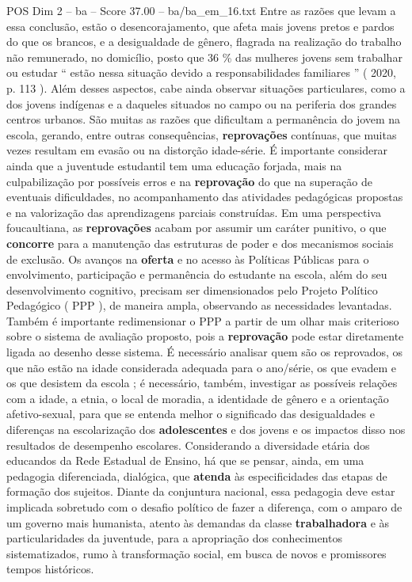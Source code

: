 \begin{textsample}{POS Dim 2 – ba – Score 37.00 – ba/ba\_em\_16.txt}
Entre as razões que levam a essa conclusão, estão o desencorajamento, que afeta mais jovens pretos e pardos do que os brancos, e a desigualdade de gênero, flagrada na realização do trabalho não remunerado, no domicílio, posto que 36 \% das mulheres jovens sem trabalhar ou estudar “ estão nessa situação devido a responsabilidades familiares ” ( 2020, p. 113 ).
Além desses aspectos, cabe ainda observar situações particulares, como a dos jovens indígenas e a daqueles situados no campo ou na periferia dos grandes centros urbanos.
São muitas as razões que dificultam a permanência do jovem na escola, gerando, entre outras consequências, \textbf{reprovações} contínuas, que muitas vezes resultam em evasão ou na distorção idade-série.
É importante considerar ainda que a juventude estudantil tem uma educação forjada, mais na culpabilização por possíveis erros e na \textbf{reprovação} do que na superação de eventuais dificuldades, no acompanhamento das atividades pedagógicas propostas e na valorização das aprendizagens parciais construídas.
Em uma perspectiva foucaultiana, as \textbf{reprovações} acabam por assumir um caráter punitivo, o que \textbf{concorre} para a manutenção das estruturas de poder e dos mecanismos sociais de exclusão.
Os avanços na \textbf{oferta} e no acesso às Políticas Públicas para o envolvimento, participação e permanência do estudante na escola, além do seu desenvolvimento cognitivo, precisam ser dimensionados pelo Projeto Político Pedagógico ( PPP ), de maneira ampla, observando as necessidades levantadas.
Também é importante redimensionar o PPP a partir de um olhar mais criterioso sobre o sistema de avaliação proposto, pois a \textbf{reprovação} pode estar diretamente ligada ao desenho desse sistema.
É necessário analisar quem são os reprovados, os que não estão na idade considerada adequada para o ano/série, os que evadem e os que desistem da escola ; é necessário, também, investigar as possíveis relações com a idade, a etnia, o local de moradia, a identidade de gênero e a orientação afetivo-sexual, para que se entenda melhor o significado das desigualdades e diferenças na escolarização dos \textbf{adolescentes} e dos jovens e os impactos disso nos resultados de desempenho escolares.
Considerando a diversidade etária dos educandos da Rede Estadual de Ensino, há que se pensar, ainda, em uma pedagogia diferenciada, dialógica, que \textbf{atenda} às especificidades das etapas de formação dos sujeitos.
Diante da conjuntura nacional, essa pedagogia deve estar implicada sobretudo com o desafio político de fazer a diferença, com o amparo de um governo mais humanista, atento às demandas da classe \textbf{trabalhadora} e às particularidades da juventude, para a apropriação dos conhecimentos sistematizados, rumo à transformação social, em busca de novos e promissores tempos históricos.

\end{textsample}
